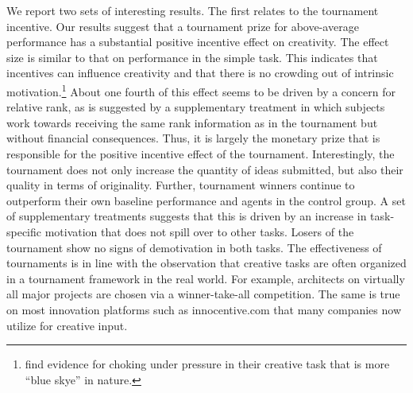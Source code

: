 We report two sets of interesting results. The first relates to the tournament incentive.
Our results suggest that a tournament prize for above-average performance has a 
substantial positive incentive effect on creativity. The effect size is similar to that on performance in the simple task. This indicates that incentives can influence creativity and that there is no crowding out of intrinsic motivation.\footnote{\citet{erat2015}
 find evidence for choking under pressure in their creative task that is more ``blue skye'' in nature.} 
 About one fourth of this effect seems to be driven by a concern for relative rank, 
as is suggested by a supplementary treatment in which 
subjects work towards receiving the same rank information as in the tournament
but without financial consequences. Thus, it is largely  the monetary prize 
that is responsible for the positive  incentive effect of the tournament. Interestingly, the tournament 
does not only increase the quantity of ideas submitted, but also their quality in terms of 
originality. Further, tournament winners continue to outperform their own baseline 
performance and agents in the control group. A set of supplementary 
treatments suggests that this is driven by an increase in task-specific motivation that does not spill over to other tasks. 
Losers of the tournament show no signs of demotivation in both tasks. 
The effectiveness of tournaments is in line with the observation that creative tasks are often 
organized in a tournament framework in the real world.  For example, architects on virtually 
all major projects are chosen via a winner-take-all competition. 
The same is true on most innovation platforms such as innocentive.com that many 
companies now utilize for creative input. 

